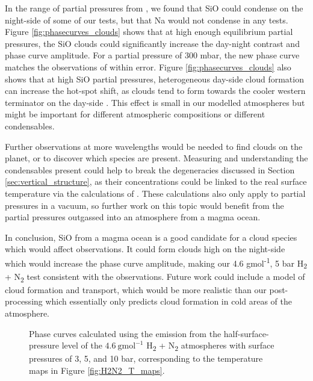 In the range of partial pressures from \citet{miguel2011compositions}, we found that SiO could condense on the night-side of some of our tests, but that Na would not condense in any tests. Figure \ref{fig:phasecurves_clouds} shows that at high enough equilibrium partial pressures, the SiO clouds could significantly increase the day-night contrast and phase curve amplitude. For a partial pressure of 300 mbar, the new phase curve matches the observations of \citet{demory2016map} within error. Figure \ref{fig:phasecurves_clouds} also shows that at high SiO partial pressures, heterogeneous day-side cloud formation can increase the hot-spot shift, as clouds tend to form towards the cooler western terminator on the day-side \citep{parmentier2016transitions}. This effect is small in our modelled atmospheres but might be important for different atmospheric compositions or different condensables.

Further observations at more wavelengths would be needed to find clouds on the planet, or to discover which species are present. Measuring and understanding the condensables present could help to break the degeneracies discussed in Section \ref{sec:vertical_structure}, as their concentrations could be linked to the real surface temperature via the calculations of \citet{miguel2011compositions}. These calculations also only apply to partial pressures in a vacuum, so further work on this topic would benefit from the partial pressures outgassed into an atmosphere from a magma ocean.

In conclusion, SiO from a magma ocean is a good candidate for a cloud species which would affect observations. It could form clouds high on the night-side which would increase the phase curve amplitude, making our 4.6 gmol\textsuperscript{-1}, 5 bar H\textsubscript{2} + N\textsubscript{2} test consistent with the observations. Future work could include a model of cloud formation and transport, which would be more realistic than our post-processing which essentially only predicts cloud formation in cold areas of the atmosphere.




\begin{figure}
\caption{Phase curves calculated using the emission from the half-surface-pressure level of the $4.6\ \mathrm{gmol}^{-1}$ H\textsubscript{2} + N\textsubscript{2} atmospheres with surface pressures of 3, 5, and 10 bar, corresponding to the temperature maps in Figure \ref{fig:H2N2_T_maps}.\label{fig:phasecurves_H2N2}}
\end{figure}

